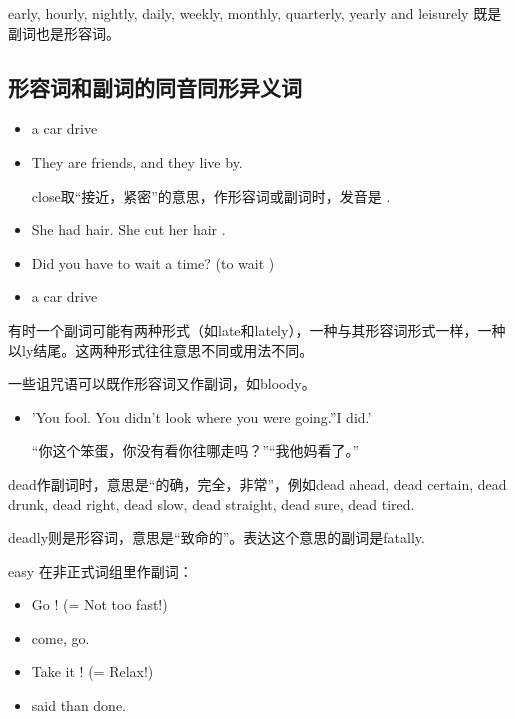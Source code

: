 early, hourly, nightly, daily, weekly, monthly, quarterly, yearly and leisurely 既是副词也是形容词。

\subsection{形容词和副词的同音同形异义词}

\begin{itemize}
\item a  car drive 
\item They are  friends, and they live  by.

 close取“接近，紧密”的意思，作形容词或副词时，发音是 .
\item She had  hair. She cut her hair .

\item Did you have to wait a  time? (to wait )

\item a  car drive 
\end{itemize}

有时一个副词可能有两种形式（如late和lately），一种与其形容词形式一样，一种
以ly结尾。这两种形式往往意思不同或用法不同。

一些诅咒语可以既作形容词又作副词，如bloody。
\begin{itemize}
\item 'You  fool. You didn't look where you were going.''I  did.'

  “你这个笨蛋，你没有看你往哪走吗？”“我他妈看了。”
\end{itemize}

dead作副词时，意思是“的确，完全，非常”，例如dead ahead, dead certain, dead
drunk, dead right, dead slow, dead straight, dead sure, dead tired.

deadly则是形容词，意思是“致命的”。表达这个意思的副词是fatally.

easy 在非正式词组里作副词：
\begin{itemize}
\item Go ! (= Not too fast!)
\item {} come,  go.
\item Take it ! (= Relax!)
\item {} said than done.
\end{itemize}

